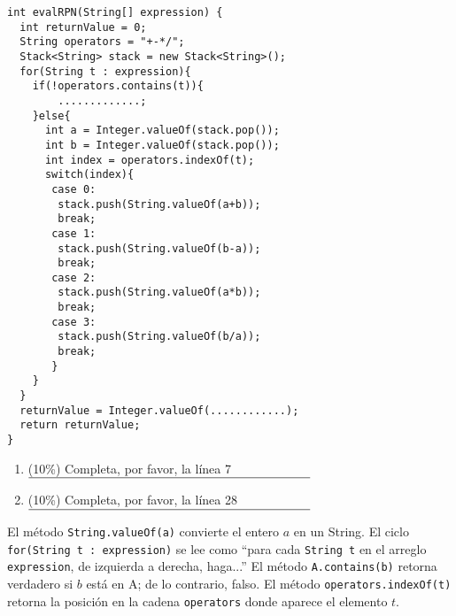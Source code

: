 \documentclass[10 pt]{article}
\begin{document}
\begin{multicols}{2}
{\footnotesize
\begin{lstlisting}
int evalRPN(String[] expression) {
  int returnValue = 0;
  String operators = "+-*/";
  Stack<String> stack = new Stack<String>();
  for(String t : expression){
    if(!operators.contains(t)){
        .............;
    }else{
      int a = Integer.valueOf(stack.pop());
      int b = Integer.valueOf(stack.pop());
      int index = operators.indexOf(t);
      switch(index){
       case 0:
        stack.push(String.valueOf(a+b));
        break;
       case 1:
        stack.push(String.valueOf(b-a));
        break;
       case 2:
        stack.push(String.valueOf(a*b));
        break;
       case 3:
        stack.push(String.valueOf(b/a));
        break;
       }
    }
  }
  returnValue = Integer.valueOf(............);
  return returnValue; 
}
\end{lstlisting}
}

\begin{enumerate}[label=\alph*]
	\item (10\%) Completa, por favor, la línea 7\\
	$\rule{8cm}{0.15mm}$

	\item (10\%) Completa, por favor, la línea 28\\
	$\rule{8cm}{0.15mm}$
\end{enumerate}

El método \texttt{String.valueOf(a)} convierte el entero $a$ en un String.
El ciclo \texttt{for(String t : expression)} se lee como ``para cada \texttt{String t} en el arreglo \texttt{expression}, de izquierda a derecha, haga...'' El método \texttt{A.contains(b)} retorna verdadero si $b$ está en A; de lo contrario, falso. El método  \texttt{operators.indexOf(t)} retorna la posición en la cadena \texttt{operators} donde aparece el elemento $t$.




\end{multicols}
\end{document}
